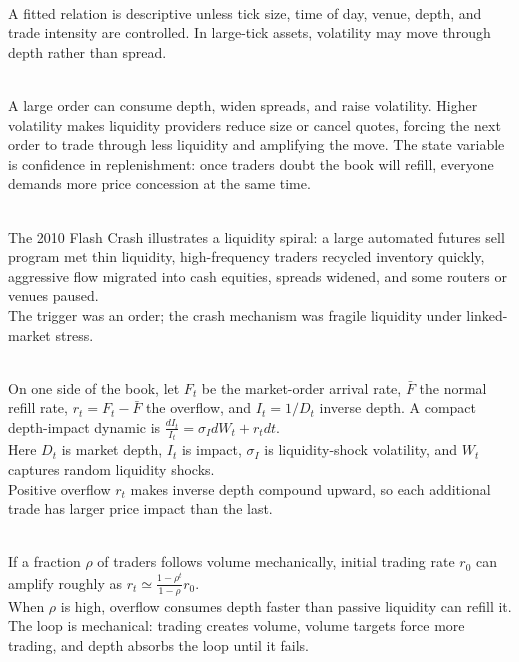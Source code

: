 \begin{caveat} \\
A fitted relation is descriptive unless tick size, time of day, venue, depth, and trade intensity are controlled. In large-tick assets, volatility may move through depth rather than spread.
\end{caveat}

\begin{mechanism} \\
A large order can consume depth, widen spreads, and raise volatility. Higher volatility makes liquidity providers reduce size or cancel quotes, forcing the next order to trade through less liquidity and amplifying the move. The state variable is confidence in replenishment: once traders doubt the book will refill, everyone demands more price concession at the same time.
\end{mechanism}

\begin{casestudy} \\
The 2010 Flash Crash illustrates a liquidity spiral: a large automated futures sell program met thin liquidity, high-frequency traders recycled inventory quickly, aggressive flow migrated into cash equities, spreads widened, and some routers or venues paused.\\
The trigger was an order; the crash mechanism was fragile liquidity under linked-market stress.
\end{casestudy}

\begin{model} \\
On one side of the book, let $F_t$ be the market-order arrival rate, $\bar{F}$ the normal refill rate, $r_t=F_t-\bar{F}$ the overflow, and $I_t=1/D_t$ inverse depth. A compact depth-impact dynamic is $\frac{dI_t}{I_t}=\sigma_I dW_t+r_tdt$.\\
Here $D_t$ is market depth, $I_t$ is impact, $\sigma_I$ is liquidity-shock volatility, and $W_t$ captures random liquidity shocks.\\
Positive overflow $r_t$ makes inverse depth compound upward, so each additional trade has larger price impact than the last.
\end{model}

\begin{mechanism} \\
If a fraction $\rho$ of traders follows volume mechanically, initial trading rate $r_0$ can amplify roughly as $r_t\simeq \frac{1-\rho^t}{1-\rho}r_0$.\\
When $\rho$ is high, overflow consumes depth faster than passive liquidity can refill it. The loop is mechanical: trading creates volume, volume targets force more trading, and depth absorbs the loop until it fails.
\end{mechanism}

